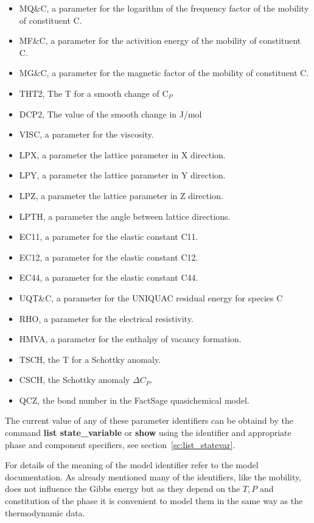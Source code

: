 \documentclass[11pt]{article}
\begin{document}
\begin{itemize}
\item MQ\&C, a parameter for the logarithm of the frequency factor of
  the mobility of constituent C.
\item MF\&C, a parameter for the activition energy of the mobility of
  constituent C.
\item MG\&C, a parameter for the magnetic factor of the mobility of
  constituent C.
\item THT2, The T for a smooth change of C$_P$ 
\item DCP2, The value of the smooth change in J/mol
\item VISC, a parameter for the viscosity.
\item LPX, a parameter the lattice parameter in X direction.
\item LPY, a parameter the lattice parameter in Y direction.
\item LPZ, a parameter the lattice parameter in Z direction.
\item LPTH, a parameter the angle between lattice directions.
\item EC11, a parameter for the elastic constant C11.
\item EC12, a parameter for the elastic constant C12.
\item EC44, a parameter for the elastic constant C44.
\item UQT\&C, a parameter for the UNIQUAC residual energy for species C
\item RHO, a parameter for the electrical resistivity.
\item HMVA, a parameter for the enthalpy of vacancy formation.
\item TSCH, the T for a Schottky anomaly.
\item CSCH, the Schottky anomaly $\Delta C_P$.
\item QCZ, the bond number in the FactSage quasichemical model.
\end{itemize}

The current value of any of these parameter identifiers can be obtaind
by the command {\bf list state\_variable} or {\bf show} using the
identifier and appropriate phase and component specifiers, see
section~\ref{sc:list_statevar}.

For details of the meaning of the model identifier refer to the model
documentation.  As already mentioned many of the identifiers, like the
mobility, does not influence the Gibbs energy but as they depend on
the $T, P$ and constitution of the phase it is convenient to model
them in the same way as the thermodynamic data.
\end{document}
